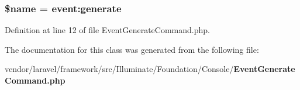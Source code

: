 \subsubsection[{\$name}]{\setlength{\rightskip}{0pt plus 5cm}\${\bf name} = \textquotesingle{}event\+:generate\textquotesingle{}\hspace{0.3cm}{\ttfamily [protected]}}\label{class_illuminate_1_1_foundation_1_1_console_1_1_event_generate_command_ab2fc40d43824ea3e1ce5d86dee0d763b}


Definition at line 12 of file Event\+Generate\+Command.\+php.



The documentation for this class was generated from the following file\+:\begin{DoxyCompactItemize}
\item 
vendor/laravel/framework/src/\+Illuminate/\+Foundation/\+Console/{\bf Event\+Generate\+Command.\+php}\end{DoxyCompactItemize}
